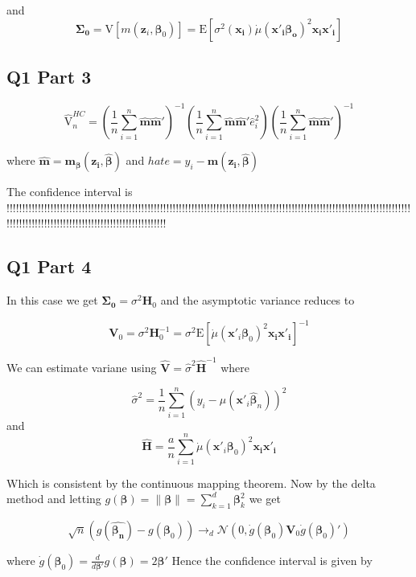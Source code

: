 \documentclass[11pt]{article}
\newcommand{\E}{\mathrm{E}}
\newcommand{\V}{\mathrm{V}}
\newcommand{\N}{\mathcal{N}}
\begin{document}
and 
$$
\bm{\Sigma_0} = \V[m(\bm{z}_i, \bm{\beta}_0)] = \E[\sigma^2(\bm{x_i}) \dot{\mu}(\bm{x'_i \beta_o})^2 \bm{x_ix'_i}]
$$


\subsection{Q1 Part 3}

$$\hat{\V}_n^{HC} = \left( \frac{1}{n} \sum_{i=1}^{n} \hat{\bm{m}} \hat{\bm{m}}'  \right)^{-1}  \left( \frac{1}{n} \sum_{i=1}^{n} \hat{\bm{m}} \hat{\bm{m}}' \hat{e}_i^2  \right) \left( \frac{1}{n} \sum_{i=1}^{n} \hat{\bm{m}} \hat{\bm{m}}'  \right)^{-1} 
$$

where $\hat{\bm{m}} = \bm{m_{\beta}(z_i, \hat{\beta})} $  and $ hat{e} = y_i -\bm{m(z_i, \hat{\beta})} $

The confidence interval is 
!!!!!!!!!!!!!!!!!!!!!!!!!!!!!!!!!!!!!!!!!!!!!!!!!!!!!!!!!!!!!!!!!!!!!!!!!!!!!!!!!!!!!!!!!!!!!!!!!!!!!!!!!!!!!!!!!!!!!!!!!!!!!!!!!!!!!!!!!!!!!!!!!!!!!!!!!!!!!!!!!!!!!!!!!!!!!!!!!!!!


\subsection{Q1 Part 4}

In this case we get $\bm{\Sigma_0} = \sigma^2 \bm{H}_0$ and the asymptotic variance reduces to 

$$ \bm{V}_0 = \sigma^2 \bm{H}_0 ^{-1} = \sigma^2 \E[ \dot{\mu}(\bm{x}'_i \bm{\beta}_0)^2\bm{x_ix'_i} ]^{-1} $$

We can estimate variane using $\hat{\bm{V}} = \hat{\sigma}^2 \hat{\bm{H}}^{-1}$ where 

$$ \hat{\sigma}^2 = \frac{1}{n} \sum_{i=1}^{n}(y_i - \mu(\bm{x}'_i \hat{\bm{\beta}}_n))^2
$$
and 
$$ \hat{\bm{H}} = \frac{a}{n} \sum_{i=1}^{n}\dot{\mu}(\bm{x}'_i \bm{\beta}_0)^2\bm{x_ix'_i}
$$

Which is consistent by the continuous mapping theorem. Now by the delta method and letting $g(\bm{\beta}) = \lVert \bm{\beta} \rVert = \sum_{k=1}^{d} \bm{\beta}_k^2
$ we get 

$$ \sqrt{n}(g(\hat{\bm{\beta_n}}) - g(\bm{\beta}_0)) \to_d \N (0, \dot{g}(\bm{\beta}_0) \bm{V}_0 \dot{g}(\bm{\beta}_0)')
$$

where $\dot{g}(\bm{\beta}_0) = \frac{d}{d\bm{\beta}'}g(\bm{\beta}) = 2 \bm{\beta}' $ Hence the confidence interval is given by 
\end{document}
